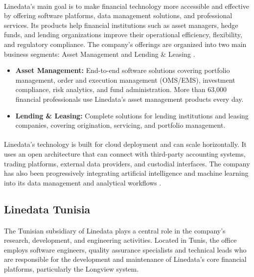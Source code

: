 \paragraph{}Linedata's main goal is to make financial technology more accessible and effective by offering software platforms, data management solutions, and professional services. Its products help financial institutions such as asset managers, hedge funds, and lending organizations improve their operational efficiency, flexibility, and regulatory compliance. The company's offerings are organized into two main business segments: Asset Management and Lending \& Leasing \cite{linedata_about}.

\begin{itemize}
\item \textbf{Asset Management:} End-to-end software solutions covering portfolio management, order and execution management (OMS/EMS), investment compliance, risk analytics, and fund administration. More than 63,000 financial professionals use Linedata's asset management products every day.
\item \textbf{Lending \& Leasing:} Complete solutions for lending institutions and leasing companies, covering origination, servicing, and portfolio management.
\end{itemize}

\paragraph{}Linedata's technology is built for cloud deployment and can scale horizontally. It uses an open architecture that can connect with third-party accounting systems, trading platforms, external data providers, and custodial interfaces. The company has also been progressively integrating artificial intelligence and machine learning into its data management and analytical workflows \cite{linedata_ai}.

\subsection{Linedata Tunisia}

\paragraph{}The Tunisian subsidiary of Linedata plays a central role in the company's research, development, and engineering activities. Located in Tunis, the office employs software engineers, quality assurance specialists and technical leads who are responsible for the development and maintenance of Linedata's core financial platforms, particularly the Longview system.

